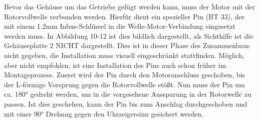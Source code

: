 \documentclass[10pt, a4paper]{article}
\begin{document}
Bevor das Gehäuse um das Getriebe gefügt werden kann, muss der Motor mit der Rotorvollwelle verbunden werden. Hierfür dient ein spezieller Pin (BT 33), der mit einem 1.2mm Inbus-Schlüssel in die Welle-Motor-Verbindung eingesetzt werden muss. In Abbildung 10-12 ist dies bildlich dargestellt, als Sichthilfe ist die Gehäuseplatte 2 NICHT dargestellt. Dies ist in dieser Phase des Zusammenbaus nicht gegeben, die Installation muss visuell eingeschränkt stattfinden. Möglich, aber nicht empfohlen, ist eine Installation des Pins auch schon früher im Montageprozess. Zuerst wird der Pin durch den Motoranschluss geschoben, bis der L-förmige Vorsprung gegen die Rotorvollwelle stößt. Nun muss der Pin um ca. 180° gedreht werden, um in die vorgesehene Aussparung in der Rotorwelle zu passen. Ist dies geschehen, kann der Pin bis zum Anschlag durchgeschoben und mit einer 90° Drehung gegen den Uhrzeigersinn gesichert werden. 
\vspace{-15pt}
\begin{flushleft}
  \begin{minipage}{0.22\textwidth}
    \vspace{-11pt}
    \vspace{-20pt}
  \end{minipage}
  \begin{minipage}{0.22\textwidth}
    \vspace{9pt}
    \vspace{-20pt}
  \end{minipage}
  \begin{minipage}{0.22\textwidth}
    \vspace{-20pt}
  \end{minipage}
\end{flushleft}
\end{document}
